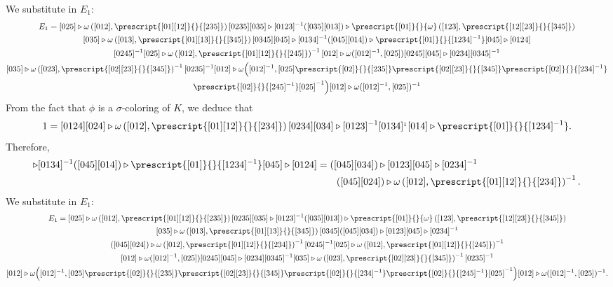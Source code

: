 \documentclass[a4paper, oneside]{amsart}
\numberwithin{equation}{subsection}
\theoremstyle{referencedlemma}
\theoremstyle{plain} %
\theoremstyle{remark}
\begin{document}
We substitute in $E_1$: 
\begin{multline*}
E_1 = [025]\triangleright \omega\left([012], \prescript{[01][12]}{}{[235]} \right) [0235] [035]\triangleright [0123]^{-1} ([035][013]) \triangleright \prescript{[01]}{}{\omega} \left([123], \prescript{[12][23]}{}{[345]} \right)\\
[035]\triangleright \omega\left([013], \prescript{[01][13]}{}{[345]} \right)[0345][045]\triangleright [0134]^{-1} ([045][014])\triangleright \prescript{[01]}{}{[1234]^{-1}} [045]\triangleright [0124]\\
 [0245]^{-1}[025]\triangleright \omega\left([012], \prescript{[01][12]}{}{[245]} \right)^{-1} [012] \triangleright \omega ([012]^{-1}, [025]) [0245][045]\triangleright [0234][0345]^{-1}\\
 [035] \triangleright \omega\left([023], \prescript{[02][23]}{}{[345]} \right)^{-1} [0235]^{-1} [012]\triangleright \omega \Big ([012]^{-1}, [025]\prescript{[02]}{}{[235]}\prescript{[02][23]}{}{[345]}\prescript{[02]}{}{[234]^{-1}} \\
\prescript{[02]}{}{[245]^{-1}} [025]^{-1} \Big ) [012]\triangleright \omega ([012]^{-1}, [025])^{-1}
\end{multline*}
From the fact that $\phi$ is a $\sigma$-coloring of $K$, we deduce that 
\begin{equation*}
1 = [0124][024]\triangleright \omega\left([012], \prescript{[01][12]}{}{[234]} \right)[0234][034]\triangleright [0123]^{-1}[0134]^{_1}[014]\triangleright \prescript{[01]}{}{[1234]^{-1}}.
\end{equation*}
Therefore, 
\begin{align*}
[045]\triangleright [0134]^{-1}([045][014]) \triangleright \prescript{[01]}{}{[1234]^{-1}}[045]\triangleright [0124] &= ([045][034]) \triangleright [0123][045]\triangleright [0234]^{-1}\\
& \quad \quad ([045][024]) \triangleright \omega \left( [012], \prescript{[01][12]}{}{[234]} \right)^{-1}.
\end{align*}
We substitute in $E_1$:
\begin{multline*}
E_1 = [025]\triangleright \omega\left([012], \prescript{[01][12]}{}{[235]} \right) [0235] [035]\triangleright [0123]^{-1} ([035][013]) \triangleright \prescript{[01]}{}{\omega} \left([123], \prescript{[12][23]}{}{[345]} \right)\\
[035]\triangleright \omega\left([013], \prescript{[01][13]}{}{[345]} \right)[0345]([045][034]) \triangleright [0123][045]\triangleright [0234]^{-1} \\
([045][024]) \triangleright \omega \left( [012], \prescript{[01][12]}{}{[234]} \right)^{-1} [0245]^{-1}[025]\triangleright \omega\left([012], \prescript{[01][12]}{}{[245]} \right)^{-1} \\
 [012] \triangleright \omega ([012]^{-1}, [025]) [0245][045]\triangleright [0234][0345]^{-1}  [035] \triangleright \omega\left([023], \prescript{[02][23]}{}{[345]} \right)^{-1} [0235]^{-1} \\
 [012]\triangleright \omega \Big ([012]^{-1}, [025]\prescript{[02]}{}{[235]}\prescript{[02][23]}{}{[345]}\prescript{[02]}{}{[234]^{-1}} \prescript{[02]}{}{[245]^{-1}} [025]^{-1} \Big ) [012]\triangleright \omega ([012]^{-1}, [025])^{-1}.
\end{multline*}
\end{document}
